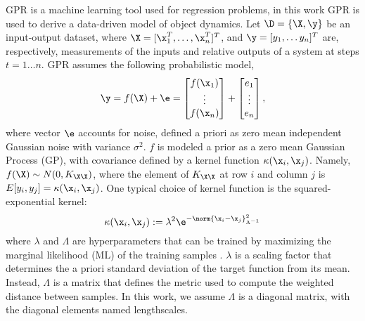GPR is a machine learning tool used for regression problems, in this work GPR is used to derive a data-driven model of object dynamics.
Let $\D = \{\X, \y\}$ be an input-output dataset, where 
$\X = [{\x}_1^T, \dots, {\x}_n^T]^T$, and $\y=[y_1, \dots y_n]^T$ are, respectively, measurements of the inputs and relative outputs of a system at steps $t = 1 \dots n$.
GPR assumes the following probabilistic model,
\begin{equation}
    \y = f({\X}) + \e = \begin{bmatrix}
        f({\x}_1) \\ \vdots \\ f({\x}_n)
    \end{bmatrix} + \begin{bmatrix}
        {e}_1 \\ \vdots \\ {e}_n
    \end{bmatrix},
\end{equation}
where vector $\e$ accounts for noise, defined a priori as zero mean independent Gaussian noise with variance $\sigma^2$. $f$ is modeled a prior as a zero mean Gaussian Process (GP), with covariance defined by a kernel function $\kappa({\x}_{i},{\x}_{j})$. Namely,  $f({\X}) \sim N(0, K_{{\X} {\X}})$, where the element of $K_{{\X} {\X}}$ at row $i$ and column $j$ is $E[y_{i}, y_{j}] = \kappa({\x}_{i},{\x}_{j})$. 
One typical choice of kernel function is the squared-exponential kernel: 
\begin{equation}\label{eq:se-kernel}
    \kappa({\x}_{i}, {\x}_{j}):= \lambda^2 \e^{-\norm{{\x}_{i}- {\x}_{j}}^2_{\Lambda^{-1}}}
\end{equation}
where $\lambda$ and $\Lambda$ are hyperparameters that can be trained by maximizing the marginal likelihood (ML) of the training samples \cite{rasmussen2003gps_for_ml}.
$\lambda$ is a scaling factor that determines the a priori standard deviation of the target function from its mean. Instead, $\Lambda$ is a matrix that defines the metric used to compute the weighted distance between samples. In this work, we assume $\Lambda$  is a diagonal matrix, with the diagonal elements named lengthscales.%


